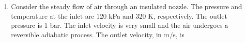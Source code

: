 \documentclass[a4paper,10pt]{article}
\begin{document}
\begin{enumerate}
    \hfill{}
    \begin{enumerate}[label=\Alph*)]
    \end{enumerate}

    \item Consider the steady flow of air through an insulated nozzle. The pressure and temperature at the inlet are $120$ kPa and $320$ K, respectively. The outlet pressure is $1$ bar. The inlet velocity is very small and the air undergoes a reversible adiabatic process. The outlet velocity, in m/s, is
    
    \hfill{}
    \begin{enumerate}[label=\Alph*)]
    \end{enumerate}
\end{enumerate}
\clearpage
\end{document}
